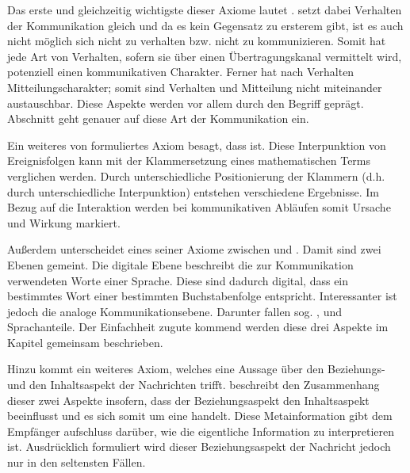 Das erste und gleichzeitig wichtigste dieser Axiome lautet .
 setzt dabei Verhalten der Kommunikation gleich und da es kein Gegensatz zu ersterem gibt, ist es auch nicht möglich sich nicht zu verhalten bzw. nicht zu kommunizieren.
Somit hat jede Art von Verhalten, sofern sie über einen Übertragungskanal vermittelt wird, potenziell einen kommunikativen Charakter.
Ferner hat nach  Verhalten Mitteilungscharakter; somit sind Verhalten und Mitteilung nicht miteinander austauschbar.
Diese Aspekte werden vor allem durch den Begriff  geprägt.
Abschnitt  geht genauer auf diese Art der Kommunikation ein.
\citep{grundlagen-der-kommunikation}
\citep{watzlawick}

Ein weiteres von  formuliertes Axiom besagt, dass  ist.
Diese Interpunktion von Ereignisfolgen kann mit der Klammersetzung eines mathematischen Terms verglichen werden.
Durch unterschiedliche Positionierung der Klammern (d.h. durch unterschiedliche Interpunktion) entstehen verschiedene Ergebnisse.
Im Bezug auf die Interaktion werden bei kommunikativen Abläufen somit Ursache und Wirkung markiert.
\citep{grundlagen-der-kommunikation}
\citep{watzlawick}

Außerdem unterscheidet eines seiner Axiome zwischen  und . Damit sind zwei Ebenen gemeint.
Die digitale Ebene beschreibt die zur Kommunikation verwendeten Worte einer Sprache.
Diese sind dadurch digital, dass ein bestimmtes Wort einer bestimmten Buchstabenfolge entspricht.
Interessanter ist jedoch die analoge Kommunikationsebene.
Darunter fallen sog. ,  und  Sprachanteile.
Der Einfachheit zugute kommend werden diese drei Aspekte im Kapitel  gemeinsam beschrieben.
\citep{grundlagen-der-kommunikation}
\citep{watzlawick}

Hinzu kommt ein weiteres Axiom, welches eine Aussage über den Beziehungs- und den Inhaltsaspekt der Nachrichten trifft.
 beschreibt den Zusammenhang dieser zwei Aspekte insofern, dass der Beziehungsaspekt den Inhaltsaspekt beeinflusst und es sich somit um eine  handelt.
Diese Metainformation gibt dem Empfänger aufschluss darüber, wie die eigentliche Information zu interpretieren ist.
Ausdrücklich formuliert wird dieser Beziehungsaspekt der Nachricht jedoch nur in den seltensten Fällen.
\citep{grundlagen-der-kommunikation}
\citep{watzlawick}

